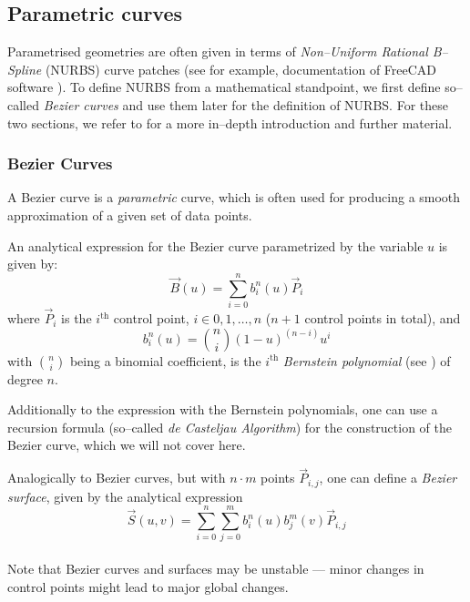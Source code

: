 \subsection{Parametric curves}
Parametrised geometries are often given in terms of \emph{Non--Uniform Rational B--Spline} (NURBS) curve patches (see for example, documentation of FreeCAD software \cite{FreeCAD}). 
To define NURBS from a mathematical standpoint, we first define so--called \emph{Bezier curves} and use them later for the definition of NURBS. For these two sections, we refer to \cite{farin2002handbook} for a more in--depth introduction and further material. 
\subsubsection{Bezier Curves}
A Bezier curve is a \textit{parametric} curve, which is often used for producing a smooth approximation of a given set of data points.
 
An analytical expression for the Bezier curve parametrized by the variable $u$ is given by:
\begin{equation*}
\vec{B}(u)=\sum\limits_{i=0}^n b_i^n(u) \vec{P}_i
\end{equation*}
where $\vec{P}_i$ is the $i^{\text{th}}$ control point, $i\in0,1, \dots ,n$ ($n+1$ control points in total), and
\begin{equation*}
b_i^n(u)=\binom{n}{i}(1-u)^{(n-i)}u^i
\end{equation*}
with $\binom{n}{i}$ being a binomial coefficient, is the $i^{\text{th}}$ \emph{Bernstein polynomial} (see \cite{lorentz2012bernstein}) of degree $n$.

Additionally to the expression with the Bernstein polynomials, one can use a recursion formula (so--called \emph{de Casteljau Algorithm}) for the construction of the Bezier curve, which we will not cover here.

Analogically to Bezier curves, but with $n\cdot m$ points $\vec{P}_{i,j}$,
one can define a \textit{Bezier surface}, given by the analytical expression
\begin{equation*}
\vec{S}(u,v)=\sum\limits_{i=0}^n \sum\limits_{j=0}^m b_i^n(u) b_j^m(v) \vec{P}_{i,j}
\end{equation*}
\\
Note that Bezier curves and surfaces may be unstable --- minor changes in control points might lead to major global changes.



